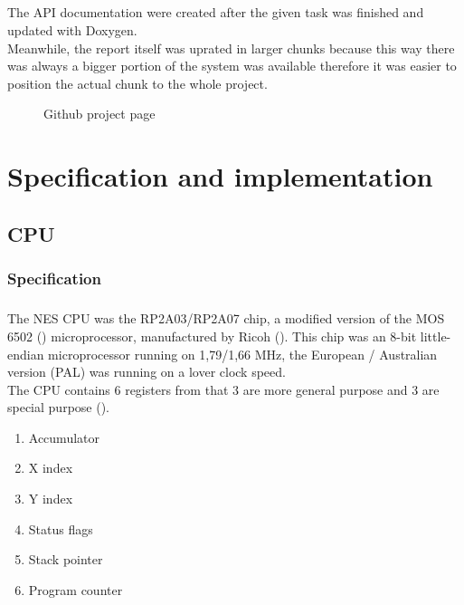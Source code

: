 \documentclass[]{report}
\begin{document}
\paragraph{ }
The API documentation were created after the given task was finished and updated with Doxygen.
\\
Meanwhile, the report itself was uprated in larger chunks because this way there was always a bigger portion of the system was available therefore it was easier to position the actual chunk to the whole project.

\begin{figure}[!htb]
\caption{\label{fig:my-label} Github project page}
\end{figure}
\clearpage

\chapter{Specification and implementation}

\section{CPU}

\subsection{Specification}

\paragraph{ }
The NES CPU was the RP2A03/RP2A07 chip, a modified version of the MOS 6502 (\cite{6502}) microprocessor, manufactured by Ricoh (\cite{RCHO}). This chip was an 8-bit little-endian microprocessor running on 1,79/1,66 MHz, the European / Australian version (PAL) was running on a lover clock speed.
\\
The CPU contains 6 registers from that 3 are more general purpose  and 3 are special purpose (\cite{REGS}).
\begin{enumerate}
	\item Accumulator
	\item X index
	\item Y index
	\item Status flags
	\item Stack  pointer
	\item Program counter
\end{enumerate}
\end{document}
